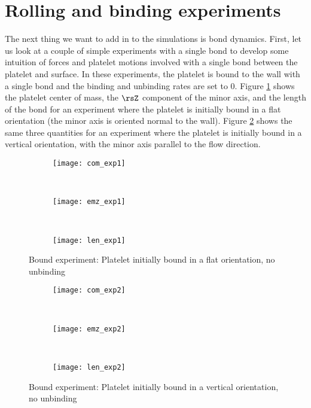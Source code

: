 \section{Rolling and binding experiments}
\label{sec:roll-bind-exper}

The next thing we want to add in to the simulations is bond
dynamics. First, let us look at a couple of simple experiments with a
single bond to develop some intuition of forces and platelet motions
involved with a single bond between the platelet and surface. In these
experiments, the platelet is bound to the wall with a single bond and
the binding and unbinding rates are set to 0. Figure \ref{fig:exp1}
shows the platelet center of mass, the $\rsZ$ component of the minor
axis, and the length of the bond for an experiment where the platelet
is initially bound in a flat orientation (the minor axis is oriented
normal to the wall). Figure \ref{fig:exp2} shows the same three
quantities for an experiment where the platelet is initially bound in
a vertical orientation, with the minor axis parallel to the flow
direction.

\begin{figure}
  \centering
  \begin{subfigure}{.5\textwidth}
    \texttt{[image: com\_exp1]}
  \end{subfigure}
  \\
  \begin{subfigure}{.5\textwidth}
    \texttt{[image: emz\_exp1]}
  \end{subfigure}
  \\
  \begin{subfigure}{.5\textwidth}
    \texttt{[image: len\_exp1]}
  \end{subfigure}
  \caption{Bound experiment: Platelet initially bound in a flat
    orientation, no unbinding}
  \label{fig:exp1}
\end{figure}

\begin{figure}
  \centering
  \begin{subfigure}{.5\textwidth}
    \texttt{[image: com\_exp2]}
  \end{subfigure}
  \\
  \begin{subfigure}{.5\textwidth}
    \texttt{[image: emz\_exp2]}
  \end{subfigure}
  \\
  \begin{subfigure}{.5\textwidth}
    \texttt{[image: len\_exp2]}
  \end{subfigure}
  \caption{Bound experiment: Platelet initially bound in a vertical
    orientation, no unbinding}
  \label{fig:exp2}
\end{figure}

